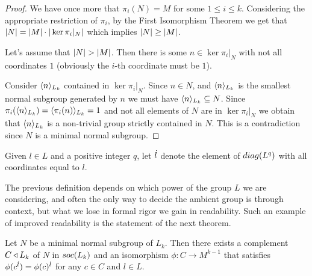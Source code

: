 \begin{proof}
    We have once more that $\pi_i(N) = M$ for some $1 \le i \le k$. Considering the appropriate restriction of $\pi_i$, by the First Isomorphism Theorem we get that $| N | = | M | \cdot | \ker{\pi_i|_{N}} |$ which implies $| N | \geq | M |$.

    Let's assume that $| N | > | M |$. Then there is some $n \in \ker{\pi_i|_{N}}$ with not all coordinates $1$ (obviously the $i$-th coordinate must be $1$).

    Consider $\langle n \rangle_{L_k}$ contained in $\ker{\pi_i|_{N}}$. Since $n \in N$, and $\langle n \rangle_{L_k}$ is the smallest normal subgroup generated by $n$ we must have $\langle n \rangle_{L_k} \subseteq N$. Since $\pi_i(\langle n \rangle_{L_k}) = \langle \pi_i(n) \rangle_{L_k} = 1$ and not all elements of $N$ are in $\ker{\pi_i|_{N}}$ we obtain that $\langle n \rangle_{L_k}$ is a non-trivial group strictly contained in $N$. This is a contradiction since $N$ is a minimal normal subgroup.
\end{proof}

\begin{definition}
    Given $l \in L$ and a positive integer $q$, let $\dot{l}$ denote the element of $diag({L^q})$ with all coordinates equal to $l$.
\end{definition}

The previous definition depends on which power of the group $L$ we are considering, and often the only way to decide the ambient group is through context, but what we lose in formal rigor we gain in readability. Such an example of improved readability is the statement of the next theorem.

\begin{theorem}
    \label{cplNsoc}
    Let $N$ be a minimal normal subgroup of $L_k$. Then there exists a complement $C \triangleleft L_k$ of $N$ in $soc {(L_k)}$ and an isomorphism $\phi \colon C \rightarrow M^{k-1}$ that satisfies $\phi(c^{\dot{l}}) = \phi(c)^{\dot{l}}$ for any $c \in C$ and $l \in L$.
\end{theorem}

